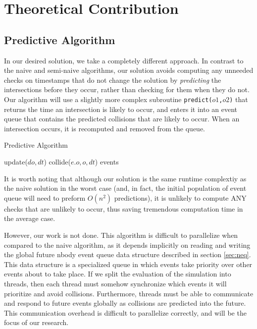 \documentclass[conference]{IEEEtran}
\begin{document}
\section{Theoretical Contribution}
\label{sec:theocont}
\subsection{Predictive Algorithm}

In our desired solution, we take a completely different approach.  In contrast to the naive and semi-naive algorithms, our solution avoids computing any unneeded checks on timestamps that do not change the solution by \textit{predicting} the intersections before they occur, rather than checking for them when they do not.  Our algorithm will use a slightly more complex subroutine \texttt{predict($o1$,$o2$)} that returns the time an intersection is likely to occur, and enters it into an event queue that contains the predicted collisions that are likely to occur.  When an intersection occurs, it is recomputed and removed from the queue.

\begin{algorithm}
\caption{Predictive Algorithm}
\begin{algorithmic}
\STATE {} %
		\STATE update($do,dt$)  
	\ENDFOR
	\STATE {}
				\STATE collide($e.o, o, dt$) 
			\ENDIF
		\ENDFOR
	\ENDFOR
\ENDFOR
\RETURN events
\end{algorithmic}
\end{algorithm}

It is worth noting that although our solution is the same runtime complextiy as the naive solution in the worst case (and, in fact, the initial population of event queue will need to preform $O(n^2)$ predictions), it is unlikely to compute ANY checks that are unlikely to occur, thus saving tremendous computation time in the average case.  

However, our work is not done.  This algorithm is difficult to parallelize when compared to the naive algorithm, as it depends implicitly on reading and writing the global future nbody event queue data structure described in section \ref{sec:neq}.  This data structure is a specialized queue in which events take priority over other events about to take place. If we split the evaluation of the simulation into threads, then each thread must somehow synchronize which events it will prioritize and avoid collisions.  Furthermore, threads must be able to communicate and respond to future events  globally as collisions are predicted into the future.  This communication overhead is difficult to parallelize correctly, and will be the focus of our research.
\end{document}
